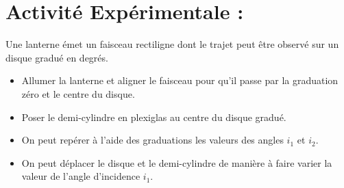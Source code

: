 \documentclass[a4paper,11pt,fleqn]{article}%
\begin{document}
\newpage
\section{Activité Expérimentale :}
Une lanterne émet un faisceau rectiligne dont le trajet peut être observé sur un disque gradué en degrés.
\begin{itemize}
	\item Allumer la lanterne et aligner le faisceau pour qu’il passe par la graduation zéro et le centre du disque.
    \item Poser le demi-cylindre en plexiglas au centre du disque gradué.
    \item On peut repérer à l’aide des graduations les valeurs des angles $i_1$ et $i_2$.
    \item On peut déplacer le disque et le demi-cylindre de manière à faire varier la valeur de l’angle d’incidence $i_1$.
   \end{itemize}
\end{document}
